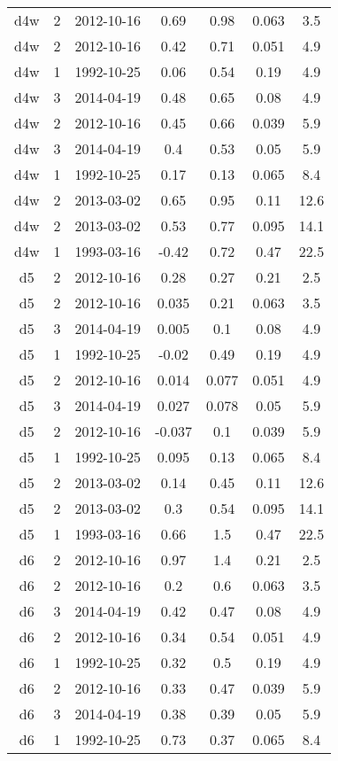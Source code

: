 \begin{longtable}[htp]
\begin{longtable}{ccccccc}
d4w & 2 & 2012-10-16 & 0.69 & 0.98 & 0.063 & 3.5 \\
d4w & 2 & 2012-10-16 & 0.42 & 0.71 & 0.051 & 4.9 \\
d4w & 1 & 1992-10-25 & 0.06 & 0.54 & 0.19 & 4.9 \\
d4w & 3 & 2014-04-19 & 0.48 & 0.65 & 0.08 & 4.9 \\
d4w & 2 & 2012-10-16 & 0.45 & 0.66 & 0.039 & 5.9 \\
d4w & 3 & 2014-04-19 & 0.4 & 0.53 & 0.05 & 5.9 \\
d4w & 1 & 1992-10-25 & 0.17 & 0.13 & 0.065 & 8.4 \\
d4w & 2 & 2013-03-02 & 0.65 & 0.95 & 0.11 & 12.6 \\
d4w & 2 & 2013-03-02 & 0.53 & 0.77 & 0.095 & 14.1 \\
d4w & 1 & 1993-03-16 & -0.42 & 0.72 & 0.47 & 22.5 \\
d5 & 2 & 2012-10-16 & 0.28 & 0.27 & 0.21 & 2.5 \\
d5 & 2 & 2012-10-16 & 0.035 & 0.21 & 0.063 & 3.5 \\
d5 & 3 & 2014-04-19 & 0.005 & 0.1 & 0.08 & 4.9 \\
d5 & 1 & 1992-10-25 & -0.02 & 0.49 & 0.19 & 4.9 \\
d5 & 2 & 2012-10-16 & 0.014 & 0.077 & 0.051 & 4.9 \\
d5 & 3 & 2014-04-19 & 0.027 & 0.078 & 0.05 & 5.9 \\
d5 & 2 & 2012-10-16 & -0.037 & 0.1 & 0.039 & 5.9 \\
d5 & 1 & 1992-10-25 & 0.095 & 0.13 & 0.065 & 8.4 \\
d5 & 2 & 2013-03-02 & 0.14 & 0.45 & 0.11 & 12.6 \\
d5 & 2 & 2013-03-02 & 0.3 & 0.54 & 0.095 & 14.1 \\
d5 & 1 & 1993-03-16 & 0.66 & 1.5 & 0.47 & 22.5 \\
d6 & 2 & 2012-10-16 & 0.97 & 1.4 & 0.21 & 2.5 \\
d6 & 2 & 2012-10-16 & 0.2 & 0.6 & 0.063 & 3.5 \\
d6 & 3 & 2014-04-19 & 0.42 & 0.47 & 0.08 & 4.9 \\
d6 & 2 & 2012-10-16 & 0.34 & 0.54 & 0.051 & 4.9 \\
d6 & 1 & 1992-10-25 & 0.32 & 0.5 & 0.19 & 4.9 \\
d6 & 2 & 2012-10-16 & 0.33 & 0.47 & 0.039 & 5.9 \\
d6 & 3 & 2014-04-19 & 0.38 & 0.39 & 0.05 & 5.9 \\
d6 & 1 & 1992-10-25 & 0.73 & 0.37 & 0.065 & 8.4 \\

\end{longtable}
\end{longtable}
